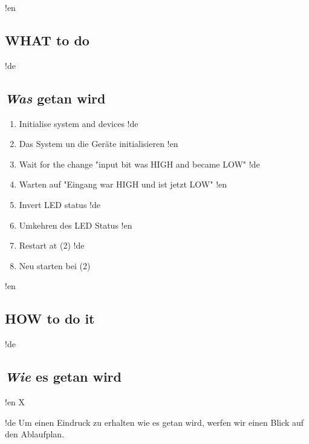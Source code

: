 !en \subsection{WHAT to do}
!de \subsection{\textit{Was} getan wird}

\begin{enumerate}
!en   \item Initialise system and devices
!de   \item Das System un die Geräte initialisieren
!en   \item Wait for the change "input bit was HIGH and became LOW"
!de   \item Warten auf "Eingang war HIGH und ist jetzt LOW"
!en   \item Invert LED status
!de   \item Umkehren des LED Status
!en   \item Restart at (2)
!de   \item Neu starten bei (2)
\end{enumerate}



!en \subsection{HOW to do it}
!de \subsection{\textit{Wie} es getan wird}



!en X

!de Um einen Eindruck zu erhalten wie es getan wird, werfen wir einen Blick auf den Ablaufplan.

